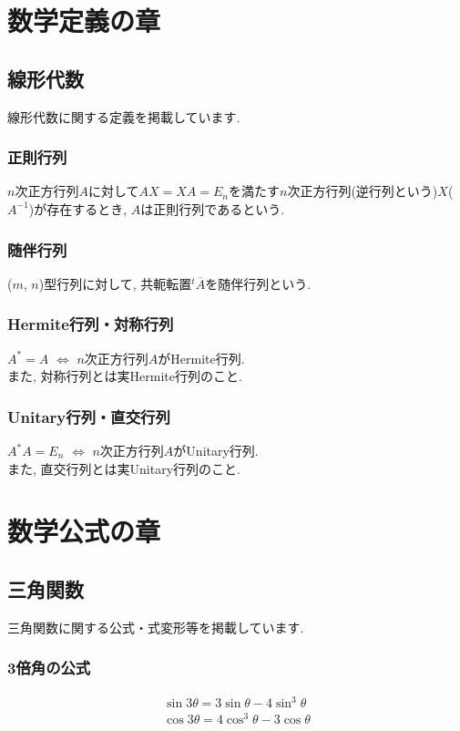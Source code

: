 \documentclass[a4paper, 12pt]{jsreport}
\begin{document}
\maketitle



\tableofcontents

\part{数学定義の章}
\chapter{線形代数}
線形代数に関する定義を掲載しています.
\section{正則行列}
$n$次正方行列$A$に対して$AX=XA=E_n$を満たす$n$次正方行列(逆行列という)$X$($A^{-1}$)が存在するとき, $A$は正則行列であるという.

\section{随伴行列}
($m$, $n$)型行列に対して, 共軛転置${}^{t}\overline{A}$を随伴行列という.

\section{Hermite行列・対称行列}
$A^*=A$ $\Leftrightarrow$ $n$次正方行列$A$がHermite行列.\\
また, 対称行列とは実Hermite行列のこと.

\section{Unitary行列・直交行列}
$A^*A=E_n$ $\Leftrightarrow$ $n$次正方行列$A$がUnitary行列.\\
また, 直交行列とは実Unitary行列のこと.

\part{数学公式の章}
\chapter{三角関数}
三角関数に関する公式・式変形等を掲載しています.
\section{3倍角の公式}
\begin{equation}
    \begin{array}{l}
        \sin3\theta=3\sin\theta-4\sin^3\theta\\
        \cos3\theta=4\cos^3\theta-3\cos\theta
    \end{array}
\end{equation}
\end{document}
